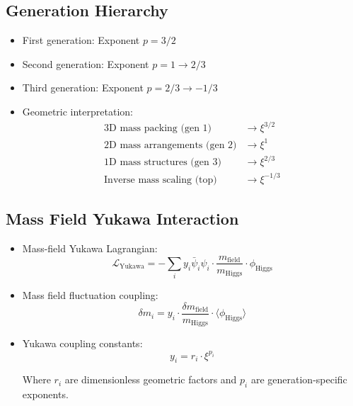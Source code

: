 \documentclass[12pt,a4paper]{article}
\begin{document}
\subsection{Generation Hierarchy}
\begin{itemize}
	\item First generation: Exponent $p = 3/2$
	\item Second generation: Exponent $p = 1 \rightarrow 2/3$
	\item Third generation: Exponent $p = 2/3 \rightarrow -1/3$
	
	\item Geometric interpretation:
	\begin{align}
		\text{3D mass packing (gen 1)} &\rightarrow \xi^{3/2}\\
		\text{2D mass arrangements (gen 2)} &\rightarrow \xi^1\\
		\text{1D mass structures (gen 3)} &\rightarrow \xi^{2/3}\\
		\text{Inverse mass scaling (top)} &\rightarrow \xi^{-1/3}
	\end{align}
\end{itemize}

\subsection{Mass Field Yukawa Interaction}
\begin{itemize}
	\item Mass-field Yukawa Lagrangian:
	\begin{equation}
		\mathcal{L}_{\text{Yukawa}} = -\sum_i y_i \bar{\psi}_i \psi_i \cdot \frac{m_{\text{field}}}{m_{\text{Higgs}}} \cdot \phi_{\text{Higgs}}
	\end{equation}
	
	\item Mass field fluctuation coupling:
	\begin{equation}
		\delta m_i = y_i \cdot \frac{\delta m_{\text{field}}}{m_{\text{Higgs}}} \cdot \langle \phi_{\text{Higgs}} \rangle
	\end{equation}
	
	\item Yukawa coupling constants:
	\begin{equation}
		y_i = r_i \cdot \xi^{p_i}
	\end{equation}
	
	Where $r_i$ are dimensionless geometric factors and $p_i$ are generation-specific exponents.
\end{itemize}
\end{document}
